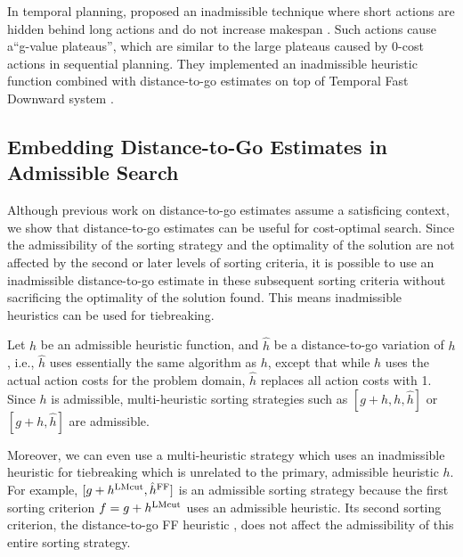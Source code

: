 In temporal planning,  proposed an inadmissible technique where short actions are
hidden behind long actions and do not increase makespan \cite{benton2010g}. Such actions cause a``g-value
plateaus'', which are similar to the large plateaus caused by 0-cost actions in sequential planning.  They implemented an inadmissible
heuristic function combined with distance-to-go estimates on top of Temporal Fast Downward system
\cite{eyerich2009using}.  %


\subsection{Embedding Distance-to-Go Estimates in Admissible Search}

Although previous work on distance-to-go estimates assume a satisficing context,
we show that distance-to-go estimates can be useful for cost-optimal search.
Since the admissibility of the sorting strategy and the optimality of the solution are not affected by the
second or later levels of sorting criteria, it is possible to use an inadmissible distance-to-go estimate
in these subsequent sorting criteria without sacrificing the optimality of the solution found.
This means inadmissible heuristics can be used for tiebreaking.


Let $h$ be an admissible heuristic function, and
$\hat{h}$ be a distance-to-go variation of $h$, i.e., $\hat{h}$ uses essentially the same algorithm as $h$, except that while $h$ uses the actual action costs for the problem domain, $\hat{h}$ replaces all action costs with 1.
Since $h$ is admissible, multi-heuristic sorting strategies such as $[g+h,h,\hat{h}]$ or $[g+h,\hat{h}]$
are admissible.

Moreover, we can even use a multi-heuristic strategy which uses an inadmissible heuristic for tiebreaking which is unrelated to the primary, admissible heuristic $h$.
 For example, $[g+h^{\text{LMcut}},\hat{h}^{\text{FF}}]$ is an admissible sorting strategy
because the first sorting criterion $f=g+h^{\text{LMcut}}$ uses an admissible
\lmcut heuristic. Its second sorting criterion, the distance-to-go FF
heuristic \cite{Hoffmann01}, does not affect the admissibility of this entire sorting strategy.

